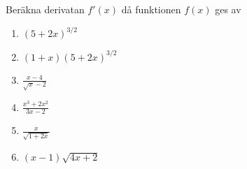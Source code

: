 

Beräkna derivatan $f'(x)$ då funktionen $f(x)$ ges av
\begin{enumerate}
\item $ (5+2x)^{3/2} $
\item $ (1+x)(5+2x)^{3/2} $
\item $ \frac{x-4}{\sqrt{x}-2} $
\item $ \frac{x^3+2x^2}{3x-2} $
\item $ \frac{x}{\sqrt{1+2x}} $
\item $ (x-1)\sqrt{4x+2} $
\end{enumerate}
